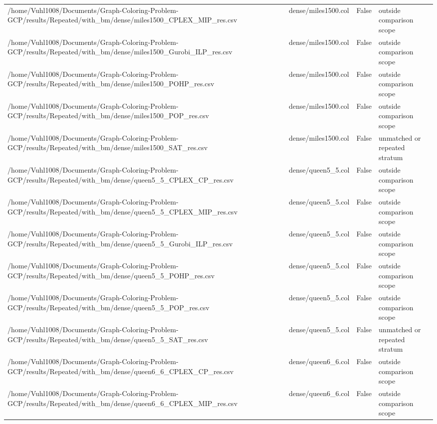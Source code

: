 \begin{table}[htbp]
\begin{tabular}{llll}
/home/Vuhl1008/Documents/Graph-Coloring-Problem-GCP/results/Repeated/with\_bm/dense/miles1500\_CPLEX\_MIP\_res.csv & dense/miles1500.col & False & outside comparison scope \\
/home/Vuhl1008/Documents/Graph-Coloring-Problem-GCP/results/Repeated/with\_bm/dense/miles1500\_Gurobi\_ILP\_res.csv & dense/miles1500.col & False & outside comparison scope \\
/home/Vuhl1008/Documents/Graph-Coloring-Problem-GCP/results/Repeated/with\_bm/dense/miles1500\_POHP\_res.csv & dense/miles1500.col & False & outside comparison scope \\
/home/Vuhl1008/Documents/Graph-Coloring-Problem-GCP/results/Repeated/with\_bm/dense/miles1500\_POP\_res.csv & dense/miles1500.col & False & outside comparison scope \\
/home/Vuhl1008/Documents/Graph-Coloring-Problem-GCP/results/Repeated/with\_bm/dense/miles1500\_SAT\_res.csv & dense/miles1500.col & False & unmatched or repeated stratum \\
/home/Vuhl1008/Documents/Graph-Coloring-Problem-GCP/results/Repeated/with\_bm/dense/queen5\_5\_CPLEX\_CP\_res.csv & dense/queen5\_5.col & False & outside comparison scope \\
/home/Vuhl1008/Documents/Graph-Coloring-Problem-GCP/results/Repeated/with\_bm/dense/queen5\_5\_CPLEX\_MIP\_res.csv & dense/queen5\_5.col & False & outside comparison scope \\
/home/Vuhl1008/Documents/Graph-Coloring-Problem-GCP/results/Repeated/with\_bm/dense/queen5\_5\_Gurobi\_ILP\_res.csv & dense/queen5\_5.col & False & outside comparison scope \\
/home/Vuhl1008/Documents/Graph-Coloring-Problem-GCP/results/Repeated/with\_bm/dense/queen5\_5\_POHP\_res.csv & dense/queen5\_5.col & False & outside comparison scope \\
/home/Vuhl1008/Documents/Graph-Coloring-Problem-GCP/results/Repeated/with\_bm/dense/queen5\_5\_POP\_res.csv & dense/queen5\_5.col & False & outside comparison scope \\
/home/Vuhl1008/Documents/Graph-Coloring-Problem-GCP/results/Repeated/with\_bm/dense/queen5\_5\_SAT\_res.csv & dense/queen5\_5.col & False & unmatched or repeated stratum \\
/home/Vuhl1008/Documents/Graph-Coloring-Problem-GCP/results/Repeated/with\_bm/dense/queen6\_6\_CPLEX\_CP\_res.csv & dense/queen6\_6.col & False & outside comparison scope \\
/home/Vuhl1008/Documents/Graph-Coloring-Problem-GCP/results/Repeated/with\_bm/dense/queen6\_6\_CPLEX\_MIP\_res.csv & dense/queen6\_6.col & False & outside comparison scope \\

\end{tabular}
\end{table}
